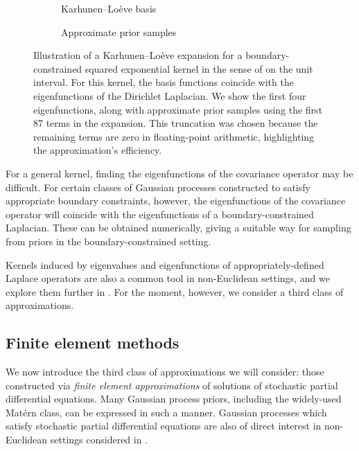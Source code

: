 \documentclass[11pt]{book}
\begin{document}
\begin{figure}
\begin{subfigure}{0.49\textwidth}

\caption{Karhunen--Loève basis}
\end{subfigure}
\begin{subfigure}{0.49\textwidth}

\caption{Approximate prior samples}
\end{subfigure}
\caption{Illustration of a Karhunen--Loève expansion for a boundary-constrained squared exponential kernel in the sense of \textcite{solin19} on the unit interval.
For this kernel, the basis functions coincide with the eigenfunctions of the Dirichlet Laplacian.
We show the first four eigenfunctions, along with approximate prior samples using the first 87 terms in the expansion. This truncation was chosen because the remaining terms are zero in floating-point arithmetic, highlighting the approximation's efficiency.}
\label{fig:gp-kl-prior}
\end{figure}

For a general kernel, finding the eigenfunctions of the covariance operator may be difficult.
For certain classes of Gaussian processes constructed to satisfy appropriate boundary constraints, however, the eigenfunctions of the covariance operator will coincide with the eigenfunctions of a boundary-constrained Laplacian.
These can be obtained numerically, giving a suitable way for sampling from priors in the boundary-constrained setting.

Kernels induced by eigenvalues and eigenfunctions of appropriately-defined Laplace operators are also a common tool in non-Euclidean settings, and we explore them further in .
For the moment, however, we consider a third class of approximations.

\subsection{Finite element methods}

We now introduce the third class of approximations we will consider: those constructed via \emph{finite element approximations} of solutions of stochastic partial differential equations.
Many Gaussian process priors, including the widely-used Matérn class, can be expressed in such a manner.
Gaussian processes which satisfy stochastic partial differential equations are also of direct interest in non-Euclidean settings considered in .
\end{document}
